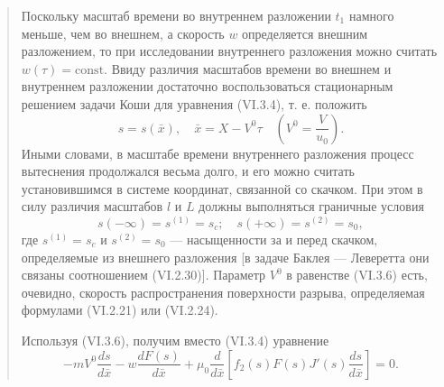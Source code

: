 \documentclass[12pt,a4paper]{article}
\begin{document}
\begin{quote}\sloppy
Поскольку масштаб времени во внутреннем разложении $t_1$ намного меньше, чем во внешнем, а скорость $w$ определяется внешним разложением, то при исследовании внутреннего разложения можно считать $w(\tau)=\mathrm{const}$. Ввиду различия масштабов времени во внешнем и внутреннем разложении достаточно воспользоваться стационарным решением задачи Коши для уравнения (VI.3.4), т. е. положить
\begin{equation}s=s(\bar x),\quad\bar x=X-V^0\tau\quad\left(V^0=\frac{V}{u_0}\right).\tag{VI.3.6}\label{q12:eq-VI-3-6}\end{equation}
Иными словами, в масштабе времени внутреннего разложения процесс вытеснения продолжался весьма долго, и его можно считать установившимся в системе координат, связанной со скачком. При этом в силу различия масштабов $l$ и $L$ должны выполняться граничные условия
\begin{equation}s(-\infty)=s^{(1)}=s_c;\quad s(+\infty)=s^{(2)}=s_0,\tag{VI.3.7}\label{q12:eq-VI-3-7}\end{equation}
где $s^{(1)}=s_c$ и $s^{(2)}=s_0$ --- насыщенности за и перед скачком, определяемые из внешнего разложения [в задаче Баклея --- Леверетта они связаны соотношением (VI.2.30)]. Параметр $V^0$ в равенстве (VI.3.6) есть, очевидно, скорость распространения поверхности разрыва, определяемая формулами (VI.2.21) или (VI.2.24).

Используя (VI.3.6), получим вместо (VI.3.4) уравнение
\begin{equation}-mV^0\frac{ds}{d\bar x}-w\frac{dF(s)}{d\bar x}+\mu_0\frac{d}{d\bar x}\left[f_2(s)F(s)J'(s)\frac{ds}{d\bar x}\right]=0.\tag{VI.3.8}\label{q12:eq-VI-3-8}\end{equation}

\par\nobreak{}\par
\end{quote}
\end{document}
